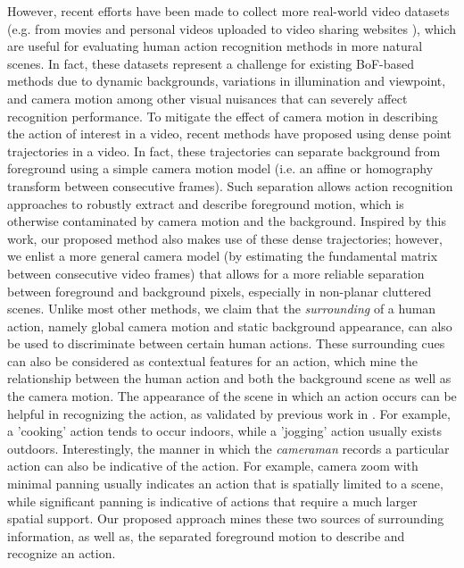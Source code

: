 However, recent efforts have been made to collect more real-world video datasets (e.g. from movies and personal videos uploaded to video sharing websites  \cite{kuehne2011,  marszalek2009}), which are useful for evaluating human action recognition methods in more natural scenes. In fact, these datasets represent a challenge for existing BoF-based methods due to dynamic backgrounds, variations in illumination and viewpoint, and camera motion among other visual nuisances that can severely affect recognition performance. To mitigate the effect of camera motion in describing the action of interest in a video, recent methods \cite{wang2013,wang2011} have proposed using dense point trajectories in a video. In fact, these trajectories can separate background from foreground using a simple camera motion model (i.e. an affine or homography transform between consecutive frames). Such separation allows action recognition approaches to robustly extract and describe foreground motion, which is otherwise contaminated by camera motion and the background. Inspired by this work, our proposed method also makes use of these dense trajectories; however, we enlist a more general camera model (by estimating the fundamental matrix between consecutive video frames) that allows for a more reliable separation between foreground and background pixels, especially in non-planar cluttered scenes. Unlike most other methods, we claim that the \emph{surrounding} of a human action, namely global camera motion and static background appearance, can also be used to discriminate between certain human actions. These surrounding cues can also be considered as contextual features for an action, which mine the relationship between the human action and both the background scene as well as the camera motion. The appearance of the scene in which an action occurs can be helpful in recognizing the action, as validated by previous work in \cite{marszalek2009}. For example, a 'cooking' action tends to occur indoors, while a 'jogging' action usually exists outdoors. Interestingly, the manner in which the \emph{cameraman} records a particular action can also be indicative of the action. For example, camera zoom with minimal panning usually indicates an action that is spatially limited to a scene, while significant panning is indicative of actions that require a much larger spatial support.  Our proposed approach mines these two sources of surrounding information, as well as, the separated foreground motion to describe and recognize an action. 



